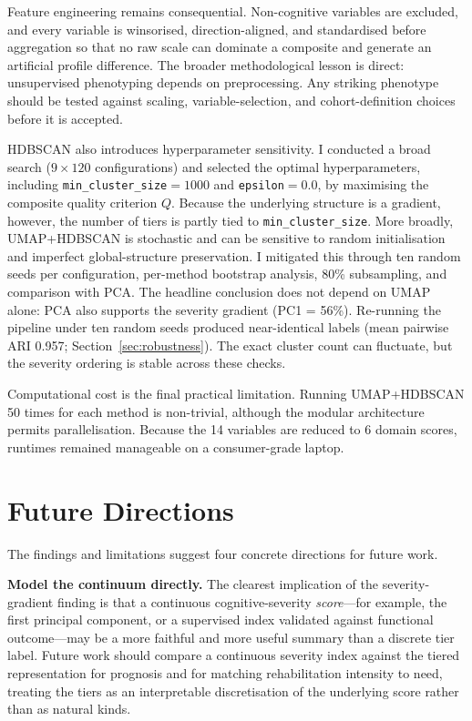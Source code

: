 Feature engineering remains consequential. Non-cognitive variables are excluded, and every variable is winsorised, direction-aligned, and standardised before aggregation so that no raw scale can dominate a composite and generate an artificial profile difference. The broader methodological lesson is direct: unsupervised phenotyping depends on preprocessing. Any striking phenotype should be tested against scaling, variable-selection, and cohort-definition choices before it is accepted.

HDBSCAN also introduces hyperparameter sensitivity. I conducted a broad search ($9 \times 120$ configurations) and selected the optimal hyperparameters, including \texttt{min\_cluster\_size}$= 1000$ and \texttt{epsilon}$= 0.0$, by maximising the composite quality criterion $Q$. Because the underlying structure is a gradient, however, the number of tiers is partly tied to \texttt{min\_cluster\_size}. More broadly, UMAP+HDBSCAN is stochastic and can be sensitive to random initialisation and imperfect global-structure preservation. I mitigated this through ten random seeds per configuration, per-method bootstrap analysis, 80\% subsampling, and comparison with PCA. The headline conclusion does not depend on UMAP alone: PCA also supports the severity gradient (PC1 = 56\%). Re-running the pipeline under ten random seeds produced near-identical labels (mean pairwise ARI 0.957; Section~\ref{sec:robustness}). The exact cluster count can fluctuate, but the severity ordering is stable across these checks.

Computational cost is the final practical limitation. Running UMAP+HDBSCAN 50 times for each method is non-trivial, although the modular architecture permits parallelisation. Because the 14 variables are reduced to 6 domain scores, runtimes remained manageable on a consumer-grade laptop.


\section{Future Directions}\label{sec:future}

The findings and limitations suggest four concrete directions for future work.

\textbf{Model the continuum directly.} The clearest implication of the severity-gradient finding is that a continuous cognitive-severity \emph{score}---for example, the first principal component, or a supervised index validated against functional outcome---may be a more faithful and more useful summary than a discrete tier label. Future work should compare a continuous severity index against the tiered representation for prognosis and for matching rehabilitation intensity to need, treating the tiers as an interpretable discretisation of the underlying score rather than as natural kinds.

